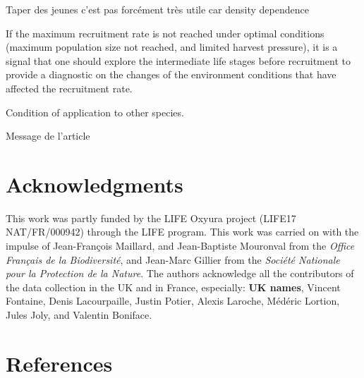 \documentclass[
  english,
]{article}
\begin{document}
Taper des jeunes c'est pas forcément très utile car density dependence

If the maximum recruitment rate is not reached under optimal conditions (maximum population size not reached, and limited harvest pressure), it is a signal that one should explore the intermediate life stages before recruitment to provide a diagnostic on the changes of the environment conditions that have affected the recruitment rate.

Condition of application to other species.

Message de l'article

\hypertarget{acknowledgments}{%
\section*{Acknowledgments}\label{acknowledgments}}

This work was partly funded by the LIFE Oxyura project (LIFE17 NAT/FR/000942) through the LIFE program. This work was carried on with the impulse of Jean-François Maillard, and Jean-Baptiste Mouronval from the \emph{Office Français de la Biodiversité}, and Jean-Marc Gillier from the \emph{Société Nationale pour la Protection de la Nature}. The authors acknowledge all the contributors of the data collection in the UK and in France, especially: \textbf{UK names}, Vincent Fontaine, Denis Lacourpaille, Justin Potier, Alexis Laroche, Médéric Lortion, Jules Joly, and Valentin Boniface.

\hypertarget{references}{%
\section*{References}\label{references}}
\end{document}
